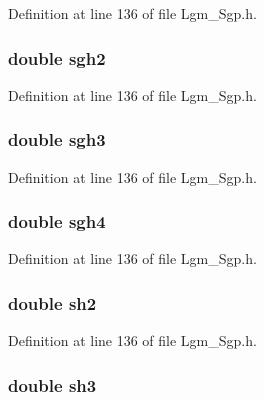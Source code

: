 Definition at line 136 of file Lgm\_\-Sgp.h.\hypertarget{struct___sgp_info_77544b4b59fd16ed1ac93adfee0eb997}{
\subsubsection[{sgh2}]{\setlength{\rightskip}{0pt plus 5cm}double {\bf sgh2}}}
\label{struct___sgp_info_77544b4b59fd16ed1ac93adfee0eb997}




Definition at line 136 of file Lgm\_\-Sgp.h.\hypertarget{struct___sgp_info_d42d32067016e78f4583075ea03773b2}{
\subsubsection[{sgh3}]{\setlength{\rightskip}{0pt plus 5cm}double {\bf sgh3}}}
\label{struct___sgp_info_d42d32067016e78f4583075ea03773b2}




Definition at line 136 of file Lgm\_\-Sgp.h.\hypertarget{struct___sgp_info_8333fff103deda5ec256d39b38beabf3}{
\subsubsection[{sgh4}]{\setlength{\rightskip}{0pt plus 5cm}double {\bf sgh4}}}
\label{struct___sgp_info_8333fff103deda5ec256d39b38beabf3}




Definition at line 136 of file Lgm\_\-Sgp.h.\hypertarget{struct___sgp_info_f39a6d6ec64bcb919784f1c046a5031d}{
\subsubsection[{sh2}]{\setlength{\rightskip}{0pt plus 5cm}double {\bf sh2}}}
\label{struct___sgp_info_f39a6d6ec64bcb919784f1c046a5031d}




Definition at line 136 of file Lgm\_\-Sgp.h.\hypertarget{struct___sgp_info_9081e5546a5c993436dcc994592f0c7a}{
\subsubsection[{sh3}]{\setlength{\rightskip}{0pt plus 5cm}double {\bf sh3}}}
\label{struct___sgp_info_9081e5546a5c993436dcc994592f0c7a}




